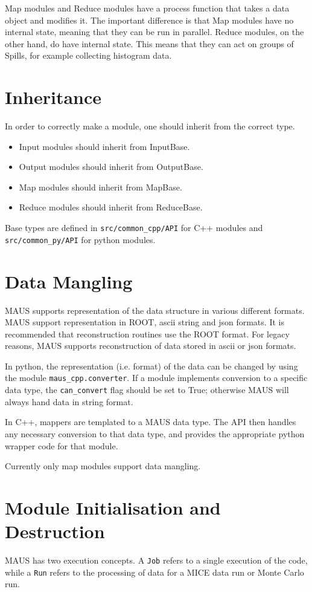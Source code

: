 Map modules and Reduce modules have a process function that takes a data object 
and modifies it. The important difference is that Map modules have no internal
state, meaning that they can be run in parallel. Reduce modules, on the other
hand, do have internal state. This means that they can act on groups of Spills,
for example collecting histogram data.

\section{Inheritance}
In order to correctly make a module, one should inherit from the correct type.

\begin{itemize}
\item Input modules should inherit from InputBase.
\item Output modules should inherit from OutputBase.
\item Map modules should inherit from MapBase.
\item Reduce modules should inherit from ReduceBase.
\end{itemize}

Base types are defined in \verb|src/common_cpp/API| for C++ modules and
\verb|src/common_py/API| for python modules.

\section{Data Mangling}
MAUS supports representation of the data structure in various different formats.
MAUS support representation in ROOT, ascii string and json formats. It is
recommended that reconstruction routines use the ROOT format. For legacy
reasons, MAUS supports reconstruction of data stored in ascii or json formats.

In python, the representation (i.e. format) of the data can be changed by using 
the module \verb|maus_cpp.converter|. If a module implements conversion to a
specific data type, the \verb|can_convert| flag should be set to True; otherwise 
MAUS will always hand data in string format.

In C++, mappers are templated to a MAUS data type. The API then handles any
necessary conversion to that data type, and provides the appropriate python
wrapper code for that module.

Currently only map modules support data mangling.

\section{Module Initialisation and Destruction}
MAUS has two execution concepts. A \verb|Job| refers to a single execution of the code, while a \verb|Run| refers to the processing of data for a MICE data run or Monte Carlo run.

